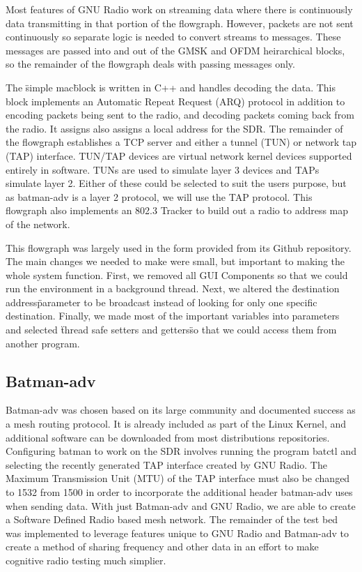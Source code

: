 Most features of GNU Radio work on streaming data where there is continuously data transmitting in that portion of the flowgraph. However, packets are not sent continuously so separate logic is needed to convert streams to messages. These messages are passed into and out of the GMSK and OFDM heirarchical blocks, so the remainder of the flowgraph deals with passing messages only. 

The \"simple mac\" block is written in C++ and handles decoding the data. This block implements an Automatic Repeat Request (ARQ) protocol in addition to encoding packets being sent to the radio, and decoding packets coming back from the radio. It assigns also assigns a local address for the SDR. The remainder of the flowgraph establishes a TCP server and either a tunnel (TUN) or network tap (TAP) interface. TUN/TAP devices are virtual network kernel devices supported entirely in software. TUNs are used to simulate layer 3 devices and TAPs simulate layer 2. Either of these could be selected to suit the users purpose, but as batman-adv is a layer 2 protocol, we will use the TAP protocol. This flowgraph also implements an 802.3 Tracker to build out a radio to address map of the network. 

This flowgraph was largely used in the form provided from its Github repository. The main changes we needed to make were small, but important to making the whole system function. First, we removed all GUI Components so that we could run the environment in a background thread. Next, we altered the \"destination address\" parameter to be broadcast instead of looking for only one specific destination. Finally, we made most of the important variables into parameters and selected \"thread safe setters and getters\" so that we could access them from another program. 

\subsection{Batman-adv}

Batman-adv was chosen based on its large community and documented success as a mesh routing protocol. It is already included as part of the Linux Kernel, and additional software can be downloaded from most distributions repositories. Configuring batman to work on the SDR involves running the program batctl and selecting the recently generated TAP interface created by GNU Radio. The Maximum Transmission Unit (MTU) of the TAP interface must also be changed to 1532 from 1500 in order to incorporate the additional header batman-adv uses when sending data. With just Batman-adv and GNU Radio, we are able to create a Software Defined Radio based mesh network. The remainder of the test bed was implemented to leverage features unique to GNU Radio and Batman-adv to create a method of sharing frequency and other data in an effort to make cognitive radio testing much simplier. 

